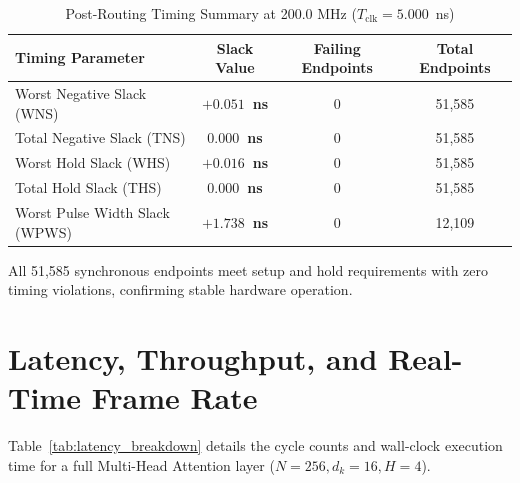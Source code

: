 \begin{table}[htbp]
    \centering
    \caption{Post-Routing Timing Summary at 200.0 MHz ($T_{\text{clk}} = 5.000$~ns)}
    \label{tab:timing_summary}
    \begin{tabular}{l c c c}
        \toprule
        \textbf{Timing Parameter} & \textbf{Slack Value} & \textbf{Failing Endpoints} & \textbf{Total Endpoints} \\
        \midrule
        Worst Negative Slack (WNS) & \textbf{$+0.051$~ns} & 0 & 51,585 \\
        Total Negative Slack (TNS) & \textbf{$0.000$~ns}  & 0 & 51,585 \\
        Worst Hold Slack (WHS)     & \textbf{$+0.016$~ns} & 0 & 51,585 \\
        Total Hold Slack (THS)     & \textbf{$0.000$~ns}  & 0 & 51,585 \\
        Worst Pulse Width Slack (WPWS) & \textbf{$+1.738$~ns} & 0 & 12,109 \\
        \bottomrule
    \end{tabular}
\end{table}

All 51,585 synchronous endpoints meet setup and hold requirements with zero timing violations, confirming stable hardware operation.

\section{Latency, Throughput, and Real-Time Frame Rate}
Table~\ref{tab:latency_breakdown} details the cycle counts and wall-clock execution time for a full Multi-Head Attention layer ($N = 256, d_k = 16, H = 4$).


